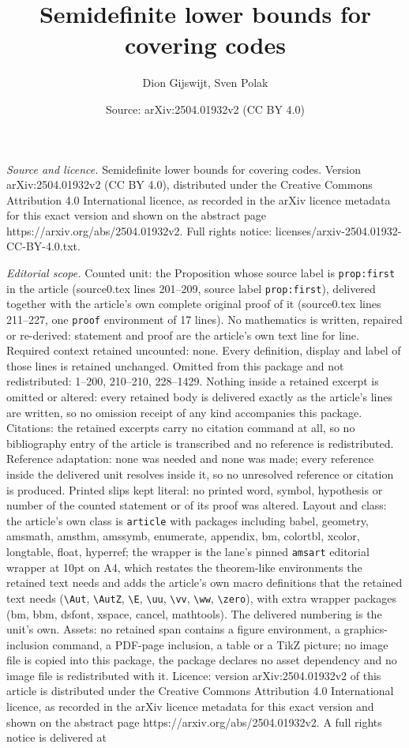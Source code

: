 \documentclass[10pt,a4paper]{amsart}
\title[Semidefinite lower bounds for covering codes]{Semidefinite lower bounds for covering codes}
\author{Dion Gijswijt, Sven Polak}
\date{Source: arXiv:2504.01932v2 (CC BY 4.0)}
\begin{document}
\maketitle

\noindent\emph{Source and licence.} Semidefinite lower bounds for covering codes. Version arXiv:2504.01932v2 (CC BY 4.0), distributed under the Creative Commons Attribution 4.0 International licence, as recorded in the arXiv licence metadata for this exact version and shown on the abstract page https://arxiv.org/abs/2504.01932v2. Full rights notice: licenses/arxiv-2504.01932-CC-BY-4.0.txt.\par\smallskip

\noindent\textit{Editorial scope.} Counted unit: the Proposition whose source label is \texttt{prop:first} in the article (source0.tex lines 201--209, source label \texttt{prop:first}), delivered together with the article's own complete original proof of it (source0.tex lines 211--227, one \texttt{proof} environment of 17 lines). No mathematics is written, repaired or re-derived: statement and proof are the article's own text line for line. Required context retained uncounted: none. Every definition, display and label of those lines is retained unchanged. Omitted from this package and not redistributed: 1--200, 210--210, 228--1429. Nothing inside a retained excerpt is omitted or altered: every retained body is delivered exactly as the article's lines are written, so no omission receipt of any kind accompanies this package. Citations: the retained excerpts carry no citation command at all, so no bibliography entry of the article is transcribed and no reference is redistributed. Reference adaptation: none was needed and none was made; every reference inside the delivered unit resolves inside it, so no unresolved reference or citation is produced. Printed slips kept literal: no printed word, symbol, hypothesis or number of the counted statement or of its proof was altered. Layout and class: the article's own class is \texttt{article} with packages including babel, geometry, amsmath, amsthm, amssymb, enumerate, appendix, bm, colortbl, xcolor, longtable, float, hyperref; the wrapper is the lane's pinned \texttt{amsart} editorial wrapper at 10pt on A4, which restates the theorem-like environments the retained text needs and adds the article's own macro definitions that the retained text needs (\texttt{\textbackslash Aut}, \texttt{\textbackslash AutZ}, \texttt{\textbackslash E}, \texttt{\textbackslash uu}, \texttt{\textbackslash vv}, \texttt{\textbackslash ww}, \texttt{\textbackslash zero}), with extra wrapper packages (bm, bbm, dsfont, xspace, cancel, mathtools). The delivered numbering is the unit's own. Assets: no retained span contains a figure environment, a graphics-inclusion command, a PDF-page inclusion, a table or a TikZ picture; no image file is copied into this package, the package declares no asset dependency and no image file is redistributed with it. Licence: version arXiv:2504.01932v2 of this article is distributed under the Creative Commons Attribution 4.0 International licence, as recorded in the arXiv licence metadata for this exact version and shown on the abstract page https://arxiv.org/abs/2504.01932v2. A full rights notice is delivered at 
\end{document}
